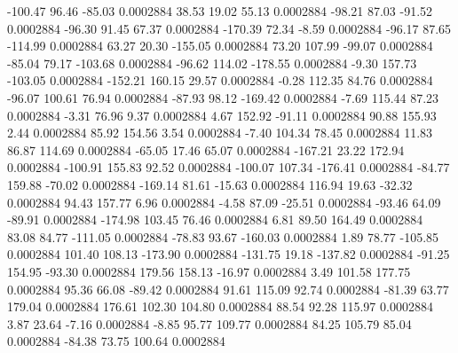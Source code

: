      -100.47       96.46      -85.03     0.0002884
       38.53       19.02       55.13     0.0002884
      -98.21       87.03      -91.52     0.0002884
      -96.30       91.45       67.37     0.0002884
     -170.39       72.34       -8.59     0.0002884
      -96.17       87.65     -114.99     0.0002884
       63.27       20.30     -155.05     0.0002884
       73.20      107.99      -99.07     0.0002884
      -85.04       79.17     -103.68     0.0002884
      -96.62      114.02     -178.55     0.0002884
       -9.30      157.73     -103.05     0.0002884
     -152.21      160.15       29.57     0.0002884
       -0.28      112.35       84.76     0.0002884
      -96.07      100.61       76.94     0.0002884
      -87.93       98.12     -169.42     0.0002884
       -7.69      115.44       87.23     0.0002884
       -3.31       76.96        9.37     0.0002884
        4.67      152.92      -91.11     0.0002884
       90.88      155.93        2.44     0.0002884
       85.92      154.56        3.54     0.0002884
       -7.40      104.34       78.45     0.0002884
       11.83       86.87      114.69     0.0002884
      -65.05       17.46       65.07     0.0002884
     -167.21       23.22      172.94     0.0002884
     -100.91      155.83       92.52     0.0002884
     -100.07      107.34     -176.41     0.0002884
      -84.77      159.88      -70.02     0.0002884
     -169.14       81.61      -15.63     0.0002884
      116.94       19.63      -32.32     0.0002884
       94.43      157.77        6.96     0.0002884
       -4.58       87.09      -25.51     0.0002884
      -93.46       64.09      -89.91     0.0002884
     -174.98      103.45       76.46     0.0002884
        6.81       89.50      164.49     0.0002884
       83.08       84.77     -111.05     0.0002884
      -78.83       93.67     -160.03     0.0002884
        1.89       78.77     -105.85     0.0002884
      101.40      108.13     -173.90     0.0002884
     -131.75       19.18     -137.82     0.0002884
      -91.25      154.95      -93.30     0.0002884
      179.56      158.13      -16.97     0.0002884
        3.49      101.58      177.75     0.0002884
       95.36       66.08      -89.42     0.0002884
       91.61      115.09       92.74     0.0002884
      -81.39       63.77      179.04     0.0002884
      176.61      102.30      104.80     0.0002884
       88.54       92.28      115.97     0.0002884
        3.87       23.64       -7.16     0.0002884
       -8.85       95.77      109.77     0.0002884
       84.25      105.79       85.04     0.0002884
      -84.38       73.75      100.64     0.0002884
